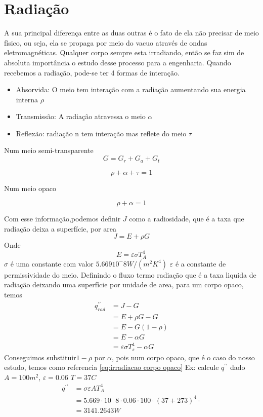 \section{Radiação}
A sua principal diferença entre as duas outras é o fato de ela não precisar de meio físico, ou seja,
ela se propaga por meio do vacuo através de ondas eletromagnéticas. Qualquer corpo sempre esta
irradiando, então se faz sim de absoluta importância o estudo desse processo para a engenharia.
Quando recebemos a radiação, pode-se ter 4 formas de interação.
\begin{itemize}
    \item Absorvida: O meio tem interação com a radiação aumentando sua energia interna \(\rho\)
    \item Transmissão: A radiação atravessa o meio \(\alpha\)
    \item Reflexão: radiação n tem interação mas reflete do meio \(\tau\)
\end{itemize}
Num meio semi-transparente
\begin{equation}
    G=G_r+G_a+G_t
\end{equation}

\begin{equation}
    \rho + \alpha + \tau =1
\end{equation}

Num meio opaco

\begin{equation}\label{eq:irradiacao corpo opaco}
    \rho + \alpha =1
\end{equation}

Com esse informação,podemos definir \(J\) como a radiosidade, que é a taxa que radiação deixa a
superfície, por area
\begin{equation}
    J=E+\rho G
\end{equation}
Onde
\begin{equation}
    E=\varepsilon \sigma T^4_A
\end{equation}
\(\sigma\) é uma constante com valor \(5.669 10^-8 W/(m^2K^4)\) \(\varepsilon\) é a constante de
permissividade do meio. Definindo o fluxo termo radiação que é a taxa liquida de radiação deixando
uma superfície por unidade de area, para um corpo opaco, temos
\begin{align}
    q^{\prime \prime}_{rad}&=J-G\\
    &=E+\rho G-G\\
    &=E-G(1-\rho)\\
    &=E-\alpha G\\
    &=\varepsilon \sigma T^4_s - \alpha G
\end{align}
Conseguimos substituir\(1-\rho\) por \(\alpha\), pois num corpo opaco, que é o caso do nosso estudo,
temos como referencia \eqref{eq:irradiacao corpo opaco} Ex: calcule \(q^{\prime \prime}\) dado
\(A=100 m^2\), \(\varepsilon=0.06\) \(T=37 C\)
\begin{align}
    q^{\prime \prime}&=\sigma \varepsilon A T^4_A\\
    &=5.669 \cdot 10^-8 \cdot 0.06 \cdot 100 \cdot (37+273)^4 \cdot\\
    &=3141.2643 W
\end{align}
